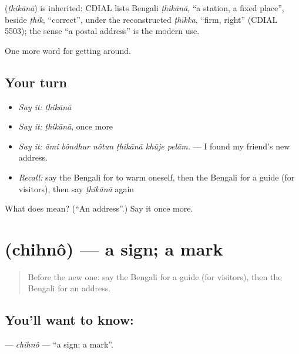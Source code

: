 \begin{cousinweb}
\textbf{} (\emph{ṭhikānā}) is inherited: CDIAL lists Bengali \emph{ṭhikānā}, \textquotedblleft{}a station, a fixed place\textquotedblright{}, beside \emph{ṭhik}, \textquotedblleft{}correct\textquotedblright{}, under the reconstructed \emph{ṭhīkka}, \textquotedblleft{}firm, right\textquotedblright{} (CDIAL 5503); the sense \textquotedblleft{}a postal address\textquotedblright{} is the modern use.
\end{cousinweb}

\begin{grammarlens}[title={What you've built}]
One more word for getting around.
\end{grammarlens}

\subsection*{Your turn}
\begin{itemize}
\raggedright
  \item \emph{Say it:} \emph{ṭhikānā}
  \item \emph{Say it:} \emph{ṭhikānā}, once more
  \item \emph{Say it:} \emph{āmi bôndhur nôtun ṭhikānā khũje pelām.} — I found my friend's new address.
  \item \emph{Recall:} say the Bengali for to warm oneself, then the Bengali for a guide (for visitors), then say \emph{ṭhikānā} again
\end{itemize}

\begin{tcolorbox}[breakable,colback=teal!4,colframe=teal!35!black,title={Before you move on}]
What does  mean? (\textquotedblleft{}An address\textquotedblright{}.) Say it once more.
\end{tcolorbox}
\section[\texorpdfstring{\bn{চিহ্ন} (chihnô)}{চিহ্ন (chihnô)}]{ (chihnô) — a sign; a mark}

\label{lesson:BN-C400-chihno}



\begin{quote}
Before the new one: say the Bengali for a guide (for visitors), then the Bengali for an address.
\end{quote}

\subsection*{You'll want to know: }
\textbf{} — \emph{chihnô} — \textquotedblleft{}a sign; a mark\textquotedblright{}.

